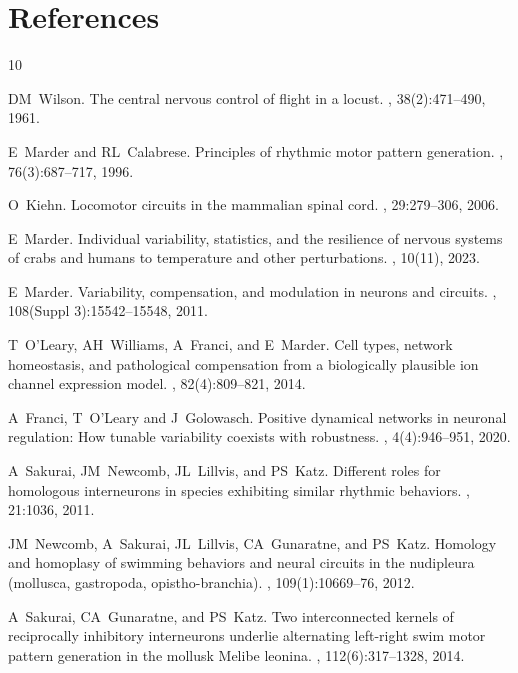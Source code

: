 \documentclass[nofootinbib,aip,amsmath,amssymb,reprint,twocolumn,10pt]{revtex4-2}
\begin{document}
\section*{References}
\begin{thebibliography}{10}

  
DM~Wilson.
\newblock The central nervous control of flight in a locust.
, 38(2):471--490, 1961.

E~Marder and RL~Calabrese.
\newblock Principles of rhythmic motor pattern generation.
, {76}({3}):687--717, {1996}.

O~Kiehn.
\newblock Locomotor circuits in the mammalian spinal cord.
, 29:279--306, 2006.

E~Marder.
\newblock Individual variability, statistics, and the resilience of nervous systems of crabs and humans to temperature and other perturbations.
, 10(11), 2023.

E~Marder.
\newblock Variability, compensation, and modulation in neurons and circuits.
, 108(Suppl 3):15542--15548, 2011.

T~O'Leary, AH~Williams, A~Franci, and E~Marder.
\newblock Cell types, network homeostasis, and pathological compensation from a biologically plausible ion channel expression model.
, 82(4):809--821, 2014.

A~Franci, T~O'Leary  and J~Golowasch.
\newblock Positive dynamical networks in neuronal regulation: How tunable variability coexists with robustness.
, 4(4):946--951, 2020.


A~Sakurai, JM~Newcomb, JL~Lillvis, and PS~Katz.
\newblock Different roles for homologous interneurons in species exhibiting
  similar rhythmic behaviors.
, 21:1036, 2011.

JM~Newcomb, A~Sakurai, JL~Lillvis, CA~Gunaratne, and PS~Katz.
\newblock Homology and homoplasy of swimming behaviors and neural circuits in
  the nudipleura (mollusca, gastropoda, 
  opistho-branchia).
, 109(1):10669--76, 2012.

A~Sakurai, CA~Gunaratne, and PS~Katz.
\newblock Two interconnected kernels of reciprocally inhibitory interneurons
  underlie alternating left-right swim motor pattern generation in the mollusk
  Melibe leonina.
, 112(6):317--1328, 2014.


\end{thebibliography}
\end{document}
